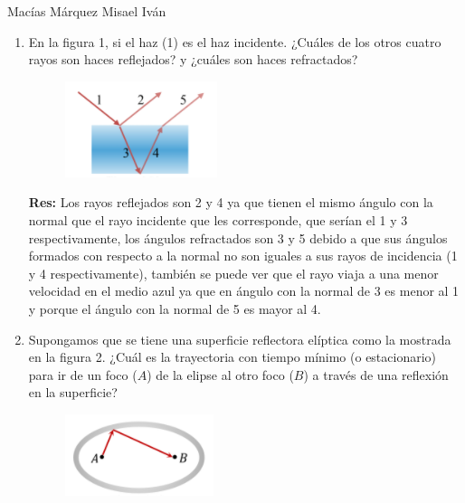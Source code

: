 \documentclass[12pt,a4paper]{article}
\begin{document}
Macías Márquez Misael Iván

\begin{enumerate}






\item En la figura 1, si el haz (1) es el haz incidente. ¿Cuáles de los otros cuatro rayos son haces reflejados? y ¿cuáles son haces refractados?


\begin{figure}[h!]
    \centering
    \includegraphics{1.PNG}
    \caption{}
    \label{fig:my_label}
\end{figure}

\textbf{Res:} Los rayos reflejados son 2 y 4 ya que tienen el mismo ángulo con la normal que el rayo incidente que les corresponde, que serían el 1 y 3 respectivamente, los ángulos refractados son 3 y 5 debido a que sus ángulos formados con respecto a la normal no son iguales a sus rayos de incidencia (1 y 4 respectivamente), también se puede ver que el rayo viaja a una menor velocidad en el medio azul ya que en ángulo con la normal de 3 es menor al 1 y porque el ángulo con la normal de 5 es mayor al 4.











\item Supongamos que se tiene una superficie reflectora elíptica como la mostrada en la figura 2. ¿Cuál es la trayectoria con tiempo mínimo (o estacionario) para ir de un foco ($A$) de la elipse al otro foco ($B$) a través de una reflexión en la superficie?

\begin{figure}[h!]
    \centering
    \includegraphics{2.PNG}
    \caption{}
    \label{fig:my_label}
\end{figure}


\end{enumerate}
\end{document}
